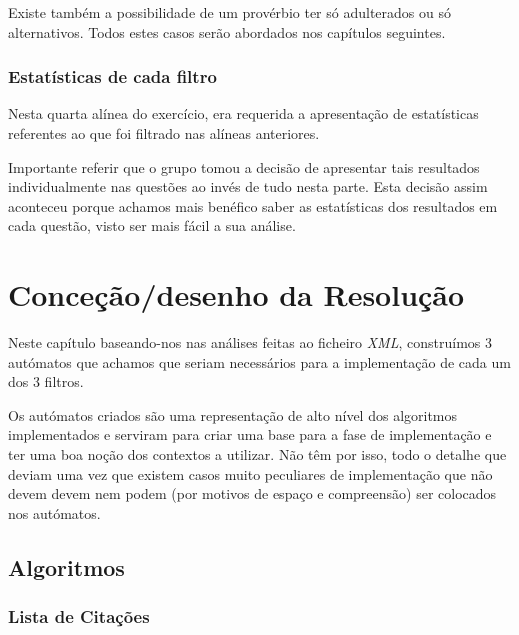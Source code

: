 \documentclass[11pt,a4paper]{report}
\begin{document}
\vspace{0.2cm}

Existe também a possibilidade de um provérbio ter só adulterados ou só alternativos. Todos estes casos serão abordados nos capítulos seguintes.

\subsection{Estatísticas de cada filtro}

Nesta quarta alínea do exercício, era requerida a apresentação de estatísticas referentes ao que foi filtrado nas alíneas anteriores.

Importante referir que o grupo tomou a decisão de apresentar tais resultados individualmente nas questões ao invés de tudo nesta parte. Esta decisão assim aconteceu porque achamos mais benéfico saber as estatísticas dos resultados em cada questão, visto ser mais fácil a sua análise.



\chapter{Conceção/desenho da Resolução}
\label{chap:concecao}

Neste capítulo baseando-nos nas análises feitas ao ficheiro \emph{XML}, construímos 3 autómatos que achamos que seriam necessários para a implementação de cada um dos 3 filtros.

Os autómatos criados são uma representação de alto nível dos algoritmos implementados e serviram para criar uma base para a fase de implementação e ter uma boa noção dos contextos a utilizar. Não têm por isso, todo o detalhe que deviam uma vez que existem casos muito peculiares de implementação que não devem devem nem podem (por motivos de espaço e compreensão) ser colocados nos autómatos.

\section{Algoritmos}
\subsection{Lista de Citações}
\end{document}
